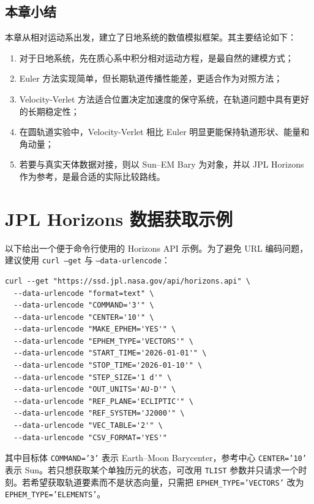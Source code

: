 \documentclass[12pt,a4paper]{ctexrep}
\begin{document}
\section{本章小结}

本章从相对运动系出发，建立了日地系统的数值模拟框架。其主要结论如下：
\begin{enumerate}[label=\arabic*.]
  \item 对于日地系统，先在质心系中积分相对运动方程，是最自然的建模方式；
  \item Euler 方法实现简单，但长期轨道传播性能差，更适合作为对照方法；
  \item Velocity-Verlet 方法适合位置决定加速度的保守系统，在轨道问题中具有更好的长期稳定性；
  \item 在圆轨道实验中，Velocity-Verlet 相比 Euler 明显更能保持轨道形状、能量和角动量；
  \item 若要与真实天体数据对接，则以 Sun--EM Bary 为对象，并以 JPL Horizons 作为参考，是最合适的实际比较路线。
\end{enumerate}

\appendix
\chapter{JPL Horizons 数据获取示例}

以下给出一个便于命令行使用的 Horizons API 示例。为了避免 URL 编码问题，建议使用 \texttt{curl --get} 与 \texttt{--data-urlencode}：

\begin{verbatim}
curl --get "https://ssd.jpl.nasa.gov/api/horizons.api" \
  --data-urlencode "format=text" \
  --data-urlencode "COMMAND='3'" \
  --data-urlencode "CENTER='10'" \
  --data-urlencode "MAKE_EPHEM='YES'" \
  --data-urlencode "EPHEM_TYPE='VECTORS'" \
  --data-urlencode "START_TIME='2026-01-01'" \
  --data-urlencode "STOP_TIME='2026-01-10'" \
  --data-urlencode "STEP_SIZE='1 d'" \
  --data-urlencode "OUT_UNITS='AU-D'" \
  --data-urlencode "REF_PLANE='ECLIPTIC'" \
  --data-urlencode "REF_SYSTEM='J2000'" \
  --data-urlencode "VEC_TABLE='2'" \
  --data-urlencode "CSV_FORMAT='YES'"
\end{verbatim}

其中目标体 \texttt{COMMAND='3'} 表示 Earth--Moon Barycenter，参考中心 \texttt{CENTER='10'} 表示 Sun。若只想获取某个单独历元的状态，可改用 \texttt{TLIST} 参数并只请求一个时刻。若希望获取轨道要素而不是状态向量，只需把 \texttt{EPHEM\_TYPE='VECTORS'} 改为 \texttt{EPHEM\_TYPE='ELEMENTS'}。
\end{document}

